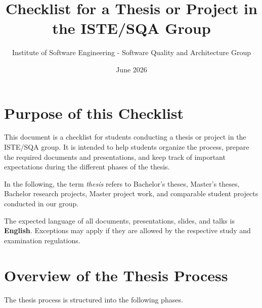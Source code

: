 \documentclass[11pt,a4paper]{article}
\title{Checklist for a Thesis or Project in the ISTE/SQA Group}
\author{Institute of Software Engineering - Software Quality and Architecture Group}
\date{June 2026}
\begin{document}
\maketitle
\tableofcontents

\newpage
\section{Purpose of this Checklist}
This document is a checklist for students conducting a thesis or project in the ISTE/SQA group.
It is intended to help students organize the process, prepare the required documents and presentations, and keep track of important expectations during the different phases of the thesis.

In the following, the term \emph{thesis} refers to Bachelor's theses, Master's theses, Bachelor research projects, Master project work, and comparable student projects conducted in our group.

The expected language of all documents, presentations, slides, and talks is \textbf{English}.
Exceptions may apply if they are allowed by the respective study and examination regulations.

\section{Overview of the Thesis Process}
The thesis process is structured into the following phases.
\end{document}

